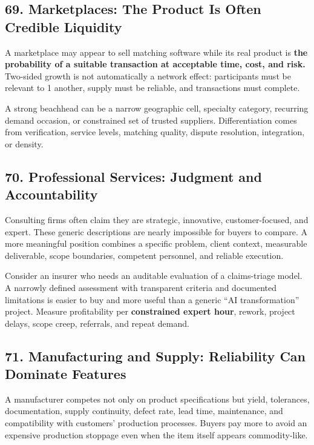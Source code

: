 \subsection*{69. Marketplaces: The Product Is Often Credible Liquidity}

A marketplace may appear to sell matching software while its real product is \textbf{the probability of a suitable transaction at acceptable time, cost, and risk.} Two-sided growth is not automatically a network effect: participants must be relevant to 1 another, supply must be reliable, and transactions must complete.

A strong beachhead can be a narrow geographic cell, specialty category, recurring demand occasion, or constrained set of trusted suppliers. Differentiation comes from verification, service levels, matching quality, dispute resolution, integration, or density.

\subsection*{70. Professional Services: Judgment and Accountability}

Consulting firms often claim they are strategic, innovative, customer-focused, and expert. These generic descriptions are nearly impossible for buyers to compare. A more meaningful position combines a specific problem, client context, measurable deliverable, scope boundaries, competent personnel, and reliable execution.

Consider an insurer who needs an auditable evaluation of a claims-triage model. A narrowly defined assessment with transparent criteria and documented limitations is easier to buy and more useful than a generic ``AI transformation'' project. Measure profitability per \textbf{constrained expert hour}, rework, project delays, scope creep, referrals, and repeat demand.

\subsection*{71. Manufacturing and Supply: Reliability Can Dominate Features}

A manufacturer competes not only on product specifications but yield, tolerances, documentation, supply continuity, defect rate, lead time, maintenance, and compatibility with customers' production processes. Buyers pay more to avoid an expensive production stoppage even when the item itself appears commodity-like.


